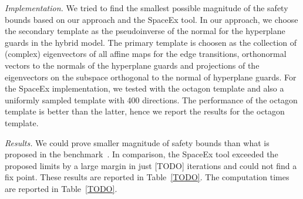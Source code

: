 \emph{Implementation.}  We tried to find the smallest possible
magnitude of the safety bounds based on our approach and the SpaceEx
tool.  In our approach, we choose the secondary template as the
pseudoinverse of the normal for the hyperplane guards in the hybrid
model.  The primary template is choosen as the collection of (complex)
eigenvectors of all affine maps for the edge transitions, orthonormal
vectors to the normals of the hyperplane guards and projections of the
eigenvectors on the subspace orthogonal to the normal of hyperplane
guards.  For the SpaceEx implementation, we tested with the octagon
template and also a uniformly sampled template with 400 directions.
The performance of the octagon template is better than the latter,
hence we report the results for the octagon template.

\emph{Results.}  We could prove smaller magnitude of safety bounds
than what is proposed in the benchmark~\cite{TODO}.  In comparison,
the SpaceEx tool exceeded the proposed limits by a large margin in just
[TODO] iterations and could not find a fix point.  These results are
reported in Table~\ref{TODO}.  The computation times are reported in
Table~\ref{TODO}.

